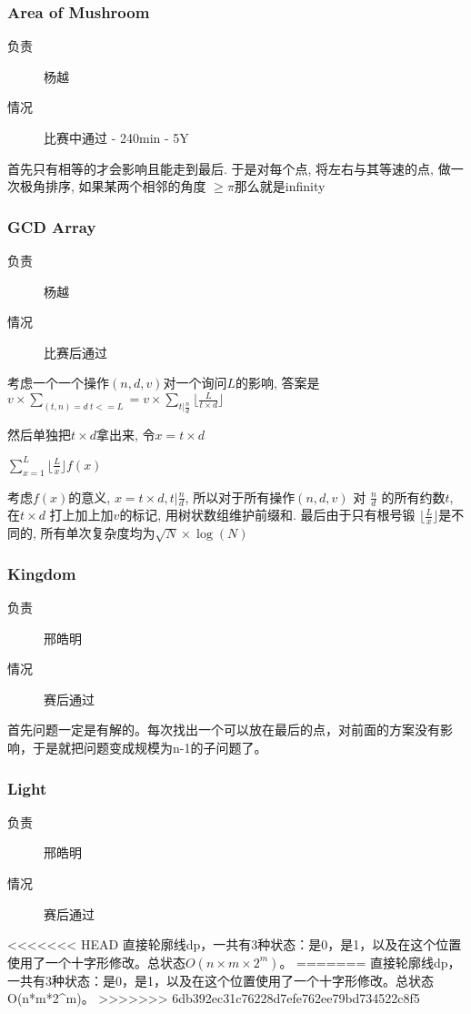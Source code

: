 \documentclass[a4paper, 11pt, nofonts, nocap, fancyhdr]{ctexart}
\newcommand{\problem}[1]{\subsubsection{#1}}
\begin{document}
\problem{Area of Mushroom}

\begin{description}
\item[负责] 杨越
\item[情况] 比赛中通过 - 240min - 5Y
\end{description}

首先只有相等的才会影响且能走到最后. 于是对每个点, 将左右与其等速的点, 做一次极角排序, 如果某两个相邻的角度 $\geq \pi$那么就是infinity

\problem{GCD Array}

\begin{description}
\item[负责] 杨越
\item[情况] 比赛后通过
\end{description}

考虑一个一个操作$(n, d, v)$对一个询问$L$的影响, 答案是$v\times \sum\limits_{(t,n)=d\ t<=L} = v\times \sum\limits_{t|\frac{n}{d}} \lfloor\frac{L}{t\times d}\rfloor$

然后单独把$t\times d$拿出来, 令$x = t\times d$

$\sum\limits_{x=1}^{L} \lfloor \frac{L}{x} \rfloor f(x)$

考虑$f(x)$的意义, $x=t\times d, t | \frac{n}{d}$, 所以对于所有操作$(n, d, v)$ 对 $\frac{n}{d}$ 的所有约数$t$, 在$t\times d$ 打上加上加$v$的标记, 用树状数组维护前缀和. 最后由于只有根号锻 $\lfloor\frac{L}{x}\rfloor$是不同的, 所有单次复杂度均为$\sqrt{N}\times \log(N)$

\problem{Kingdom}

\begin{description}
\item[负责] 邢皓明
\item[情况] 赛后通过
\end{description}

首先问题一定是有解的。每次找出一个可以放在最后的点，对前面的方案没有影响，于是就把问题变成规模为n-1的子问题了。

\problem{Light}

\begin{description}
\item[负责] 邢皓明
\item[情况] 赛后通过
\end{description}

<<<<<<< HEAD
直接轮廓线dp，一共有3种状态：是0，是1，以及在这个位置使用了一个十字形修改。总状态$O(n\times m\times 2^m)$。
=======
直接轮廓线dp，一共有3种状态：是0，是1，以及在这个位置使用了一个十字形修改。总状态O(n*m*2^m)。
>>>>>>> 6db392ec31c76228d7efe762ee79bd734522c8f5
\end{document}
